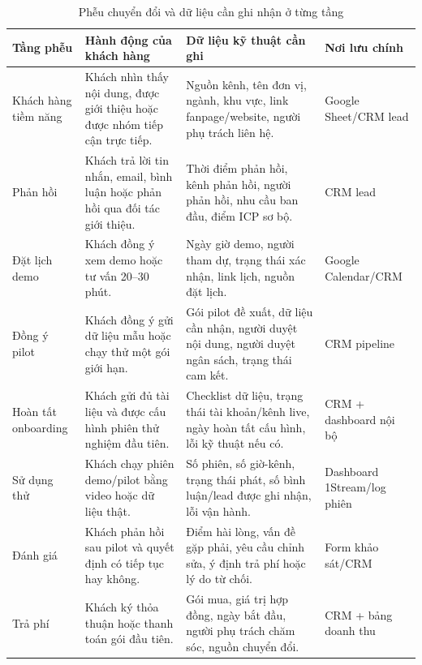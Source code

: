 \begin{table}[H]
    \centering
    \footnotesize
    \setlength{\tabcolsep}{3pt}
    \renewcommand{\arraystretch}{1.22}
    \caption{Phễu chuyển đổi và dữ liệu cần ghi nhận ở từng tầng}
    \label{tab:conversion-funnel-tracking-1stream}
    \begin{tabularx}{\linewidth}{@{}L{2.8cm}Y Y L{2.7cm}@{}}
        \toprule
        \textbf{Tầng phễu} &
        \textbf{Hành động của khách hàng} &
        \textbf{Dữ liệu kỹ thuật cần ghi} &
        \textbf{Nơi lưu chính} \\ \midrule

        Khách hàng tiềm năng &
        Khách nhìn thấy nội dung, được giới thiệu hoặc được nhóm tiếp cận trực
        tiếp. &
        Nguồn kênh, tên đơn vị, ngành, khu vực, link fanpage/website, người phụ
        trách liên hệ. &
        Google Sheet/CRM lead \\

        Phản hồi &
        Khách trả lời tin nhắn, email, bình luận hoặc phản hồi qua đối tác giới
        thiệu. &
        Thời điểm phản hồi, kênh phản hồi, người phản hồi, nhu cầu ban đầu, điểm
        ICP sơ bộ. &
        CRM lead \\

        Đặt lịch demo &
        Khách đồng ý xem demo hoặc tư vấn 20--30 phút. &
        Ngày giờ demo, người tham dự, trạng thái xác nhận, link lịch, nguồn đặt
        lịch. &
        Google Calendar/CRM \\

        Đồng ý pilot &
        Khách đồng ý gửi dữ liệu mẫu hoặc chạy thử một gói giới hạn. &
        Gói pilot đề xuất, dữ liệu cần nhận, người duyệt nội dung, người duyệt
        ngân sách, trạng thái cam kết. &
        CRM pipeline \\

        Hoàn tất onboarding &
        Khách gửi đủ tài liệu và được cấu hình phiên thử nghiệm đầu tiên. &
        Checklist dữ liệu, trạng thái tài khoản/kênh live, ngày hoàn tất cấu
        hình, lỗi kỹ thuật nếu có. &
        CRM + dashboard nội bộ \\

        Sử dụng thử &
        Khách chạy phiên demo/pilot bằng video hoặc dữ liệu thật. &
        Số phiên, số giờ-kênh, trạng thái phát, số bình luận/lead được ghi nhận,
        lỗi vận hành. &
        Dashboard 1Stream/log phiên \\

        Đánh giá &
        Khách phản hồi sau pilot và quyết định có tiếp tục hay không. &
        Điểm hài lòng, vấn đề gặp phải, yêu cầu chỉnh sửa, ý định trả phí hoặc
        lý do từ chối. &
        Form khảo sát/CRM \\

        Trả phí &
        Khách ký thỏa thuận hoặc thanh toán gói đầu tiên. &
        Gói mua, giá trị hợp đồng, ngày bắt đầu, người phụ trách chăm sóc, nguồn
        chuyển đổi. &
        CRM + bảng doanh thu \\ \bottomrule
    \end{tabularx}
\end{table}

